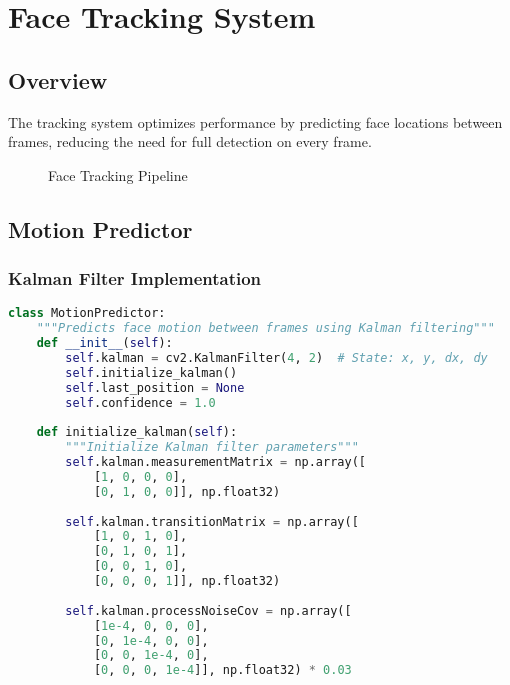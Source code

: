\chapter{Face Tracking System}

\section{Overview}
The tracking system optimizes performance by predicting face locations between frames, reducing the need for full detection on every frame.

\begin{figure}[H]
\centering
{}
\caption{Face Tracking Pipeline}
\end{figure}

\section{Motion Predictor}

\subsection{Kalman Filter Implementation}
\begin{lstlisting}[language=Python]
class MotionPredictor:
    """Predicts face motion between frames using Kalman filtering"""
    def __init__(self):
        self.kalman = cv2.KalmanFilter(4, 2)  # State: x, y, dx, dy
        self.initialize_kalman()
        self.last_position = None
        self.confidence = 1.0
        
    def initialize_kalman(self):
        """Initialize Kalman filter parameters"""
        self.kalman.measurementMatrix = np.array([
            [1, 0, 0, 0],
            [0, 1, 0, 0]], np.float32)
        
        self.kalman.transitionMatrix = np.array([
            [1, 0, 1, 0],
            [0, 1, 0, 1],
            [0, 0, 1, 0],
            [0, 0, 0, 1]], np.float32)
        
        self.kalman.processNoiseCov = np.array([
            [1e-4, 0, 0, 0],
            [0, 1e-4, 0, 0],
            [0, 0, 1e-4, 0],
            [0, 0, 0, 1e-4]], np.float32) * 0.03
\end{lstlisting}

